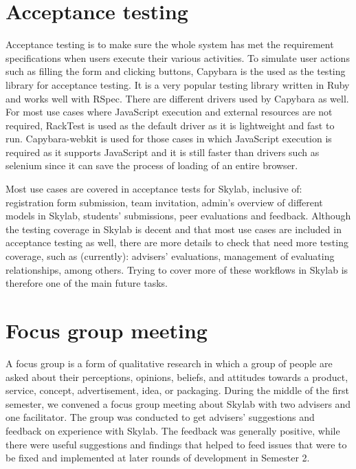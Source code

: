 \section{Acceptance testing} \label{acceptancetesting}

Acceptance testing is to make sure the whole system has met the requirement specifications when users execute their various activities\cite{citationacceptancetesting}. To simulate user actions such as filling the form and clicking buttons, Capybara is the used as the testing library for acceptance testing. It is a very popular testing library written in Ruby and works well with RSpec\cite{citationcapybara}. There are different drivers used by Capybara as well. For most use cases where JavaScript execution and external resources are not required, RackTest is used as the default driver as it is lightweight and fast to run\cite{citationcapybara}. Capybara-webkit is used for those cases in which JavaScript execution is required as it supports JavaScript and it is still faster than drivers such as selenium since it can save the process of loading of an entire browser\cite{citationcapybara}.

Most use cases are covered in acceptance tests for Skylab, inclusive of: registration form submission, team invitation, admin's overview of different models in Skylab, students' submissions, peer evaluations and feedback. Although the testing coverage in Skylab is decent and that most use cases are included in acceptance testing as well, there are more details to check that need more testing coverage, such as (currently): advisers' evaluations, management of evaluating relationships, among others. Trying to cover more of these workflows in Skylab is therefore one of the main future tasks.

\section{Focus group meeting}

A focus group is a form of qualitative research in which a group of people are asked about their perceptions, opinions, beliefs, and attitudes towards a product, service, concept, advertisement, idea, or packaging\cite{citationfocusgroup}. During the middle of the first semester, we convened a focus group meeting about Skylab with two advisers and one facilitator.  The group was conducted to get advisers' suggestions and feedback on experience with Skylab. The feedback was generally positive, while there were useful suggestions and findings that helped to feed issues that were to be fixed and implemented at later rounds of development in Semester 2.

